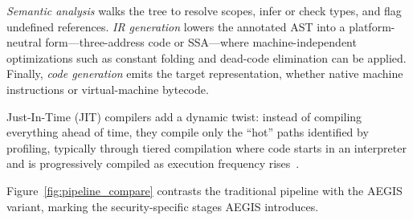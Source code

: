 \documentclass[conference]{IEEEtran}
\begin{document}
\emph{Semantic analysis} walks the tree to resolve scopes,
infer or check types, and flag undefined references.
\emph{IR generation} lowers the annotated AST into a
platform-neutral form---three-address code or SSA---where
machine-independent optimizations such as constant folding
and dead-code elimination can be applied.  Finally,
\emph{code generation} emits the target representation, whether
native machine instructions or virtual-machine bytecode.

Just-In-Time (JIT) compilers add a dynamic twist: instead of
compiling everything ahead of time, they compile only the
``hot'' paths identified by profiling, typically through tiered
compilation where code starts in an interpreter and is
progressively compiled as execution frequency
rises~\cite{qin2022jit_security,chen2024jit_val}.

Figure~\ref{fig:pipeline_compare} contrasts the traditional
pipeline with the AEGIS variant, marking the
security-specific stages AEGIS introduces.
\end{document}
